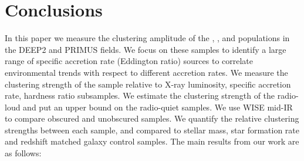 
\section{Conclusions}\label{sec:conclusions}
In this paper we measure the clustering amplitude of the \Xray, \Radio, and \IR populations in the DEEP2 and PRIMUS fields.
We focus on these samples to identify a large range of specific accretion rate (Eddington ratio) sources to correlate environmental trends with respect to different accretion rates.
We measure the clustering strength of the \Xray sample relative to X-ray luminosity, specific accretion rate, hardness ratio subsamples.
We estimate the clustering strength of the radio-loud and put an upper bound on the radio-quiet samples.
We use WISE mid-IR to compare obscured and unobscured \Assef samples.
We quantify the relative clustering strengths between each sample, and  compared to stellar mass, star formation rate and redshift matched galaxy control samples.
The main results from our work are as follows:

